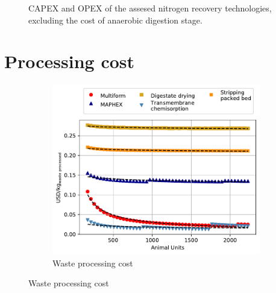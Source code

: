 \begin{refsection}[referencesApD]
\begin{figure}[h!]
	\caption{CAPEX and OPEX of the assesed nitrogen recovery technologies, excluding the cost of anaerobic digestion stage.} \label{fig:CAPEXOPEX_NoAD_NitrogenSP}
\end{figure}

\newpage

\section{Processing cost}
\begin{figure}[h!]
	\centering 
	\begin{subfigure}[t]{0.7\textwidth}
		\centering
		\includegraphics[width=1\linewidth, trim={0cm 0cm 0cm 0cm},clip]{gfx/AppendixD/ScaleUp2WasteProcCost_NoAD.pdf} 
		\caption{Waste processing cost}
		\label{fig:ScaleUp2WasteProcCost_NoAD}
	\end{subfigure}

	\bigskip


\end{figure}
\end{refsection}
